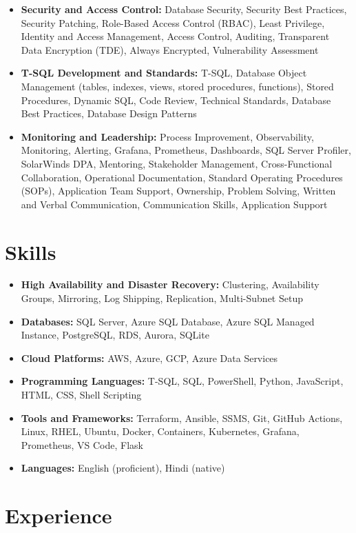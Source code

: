 \documentclass[10pt,a4paper]{article}
\begin{document}
\begin{itemize}
  \item \textbf{Security and Access Control:} Database Security, Security Best Practices, Security Patching, Role-Based Access Control (RBAC), Least Privilege, Identity and Access Management, Access Control, Auditing, Transparent Data Encryption (TDE), Always Encrypted, Vulnerability Assessment
  \item \textbf{T-SQL Development and Standards:} T-SQL, Database Object Management (tables, indexes, views, stored procedures, functions), Stored Procedures, Dynamic SQL, Code Review, Technical Standards, Database Best Practices, Database Design Patterns
  \item \textbf{Monitoring and Leadership:} Process Improvement, Observability, Monitoring, Alerting, Grafana, Prometheus, Dashboards, SQL Server Profiler, SolarWinds DPA, Mentoring, Stakeholder Management, Cross-Functional Collaboration, Operational Documentation, Standard Operating Procedures (SOPs), Application Team Support, Ownership, Problem Solving, Written and Verbal Communication, Communication Skills, Application Support
\end{itemize}

\section{Skills}
\begin{itemize}
  \item \textbf{High Availability and Disaster Recovery:} Clustering, Availability Groups, Mirroring, Log Shipping, Replication, Multi-Subnet Setup
  \item \textbf{Databases:} SQL Server, Azure SQL Database, Azure SQL Managed Instance, PostgreSQL, RDS, Aurora, SQLite
  \item \textbf{Cloud Platforms:} AWS, Azure, GCP, Azure Data Services
  \item \textbf{Programming Languages:} T-SQL, SQL, PowerShell, Python, JavaScript, HTML, CSS, Shell Scripting
  \item \textbf{Tools and Frameworks:} Terraform, Ansible, SSMS, Git, GitHub Actions, Linux, RHEL, Ubuntu, Docker, Containers, Kubernetes, Grafana, Prometheus, VS Code, Flask
  \item \textbf{Languages:} English (proficient), Hindi (native)
\end{itemize}

\section{Experience}
\end{document}
